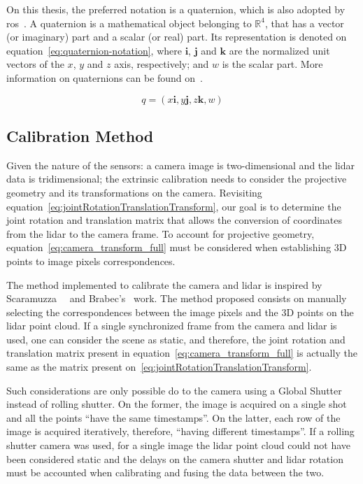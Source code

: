 On this thesis, the preferred notation is a quaternion, which is also adopted by \ac{ros}~\cite{Foote2014}. A quaternion is a mathematical object belonging to $\mathbb{R}^4$, that has a vector (or imaginary) part and a scalar (or real) part. Its representation is denoted on equation~\ref{eq:quaternion-notation}, where $\mathbf{i}$, $\mathbf{j}$ and $\mathbf{k}$ are the normalized unit vectors of the $x$, $y$ and $z$ axis, respectively; and $w$ is the scalar part. More information on quaternions can be found on~\cite{mvg_book}.

\begin{equation}
	\label{eq:quaternion-notation}
	q = (x\mathbf{i}, y\mathbf{j}, z\mathbf{k}, w)
\end{equation}

\subsection{Calibration Method}
\label{subsec:calibration:calibration-method}
Given the nature of the sensors: a camera image is two-dimensional and the \ac{lidar} data is tridimensional; the extrinsic calibration needs to consider the projective geometry and its transformations on the camera. Revisiting equation~\ref{eq:jointRotationTranslationTransform}, our goal is to determine the joint rotation and translation matrix that allows the conversion of coordinates from the \ac{lidar} to the camera frame. To account for projective geometry, equation~\ref{eq:camera_transform_full} must be considered when establishing 3D points to image pixels correspondences.

The method implemented to calibrate the camera and \ac{lidar} is inspired by Scaramuzza~\etal~\cite{Scaramuzza} and Brabec's~\cite{brabec2014} work. The method proposed consists on manually selecting the correspondences between the image pixels and the 3D points on the \ac{lidar} point cloud. If a single synchronized frame from the camera and \ac{lidar} is used, one can consider the scene as static, and therefore, the joint rotation and translation matrix present in equation~\ref{eq:camera_transform_full} is actually the same as the matrix present on~\ref{eq:jointRotationTranslationTransform}. 

Such considerations are only possible do to the camera using a Global Shutter instead of rolling shutter. On the former, the image is acquired on a single shot and all the points ``have the same timestamps''. On the latter, each row of the image is acquired iteratively, therefore, ``having different timestamps''. If a rolling shutter camera was used, for a single image the \ac{lidar} point cloud could not have been considered static and the delays on the camera shutter and \ac{lidar} rotation must be accounted when calibrating and fusing the data between the two.

